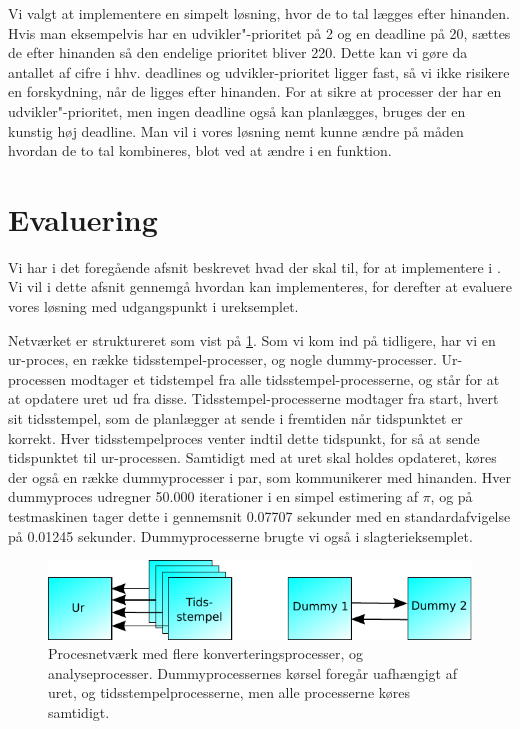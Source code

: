 Vi valgt at implementere en simpelt løsning, hvor  de to tal lægges efter hinanden. Hvis man eksempelvis har en udvikler"-prioritet på 2 og en deadline på 20, sættes de efter hinanden så den endelige prioritet bliver 220. Dette kan vi gøre da antallet af cifre i hhv. deadlines og udvikler-prioritet ligger fast, så vi ikke risikere en forskydning, når de ligges efter hinanden. For at sikre at processer der har en udvikler"-prioritet, men ingen deadline også kan planlægges, bruges der en kunstig høj deadline. Man vil i vores løsning nemt kunne ændre på måden hvordan de to tal kombineres, blot ved at ændre i en funktion. 
    
\section{Evaluering}
Vi har i det foregående afsnit beskrevet hvad der skal til, for at implementere \is i \pycsp. Vi vil i dette afsnit gennemgå hvordan \is kan implementeres, for derefter at evaluere vores løsning med udgangspunkt i ureksemplet.

Netværket er struktureret som vist på \cref{fig:watch_network}. Som vi kom ind på tidligere, har vi en ur-proces, en række tidsstempel-processer, og nogle dummy-processer. Ur-processen modtager et tidstempel fra alle  tidsstempel-processerne, og står for at at opdatere uret ud fra disse. Tidsstempel-processerne modtager fra start, hvert sit tidsstempel, som de planlægger at sende i fremtiden når tidspunktet er korrekt. Hver tidsstempelproces  venter indtil dette tidspunkt, for så at sende tidspunktet til ur-processen. Samtidigt med at uret skal holdes opdateret, køres der også en række dummyprocesser i par, som kommunikerer med hinanden. Hver dummyproces udregner 50.000 iterationer i en simpel estimering af $\pi$, og på testmaskinen tager dette i gennemsnit 0.07707 sekunder med en standardafvigelse på 0.01245 sekunder. Dummyprocesserne brugte vi også i slagterieksemplet.
\begin{figure}
 \begin{center}
  \includegraphics[scale=1]{images/watch-network}
	\caption{Procesnetværk med flere konverteringsprocesser, og analyseprocesser. Dummyprocessernes kørsel foregår uafhængigt af uret, og tidsstempelprocesserne, men alle processerne køres samtidigt.}
	\label{fig:watch_network}
\end{center}
\end{figure}

